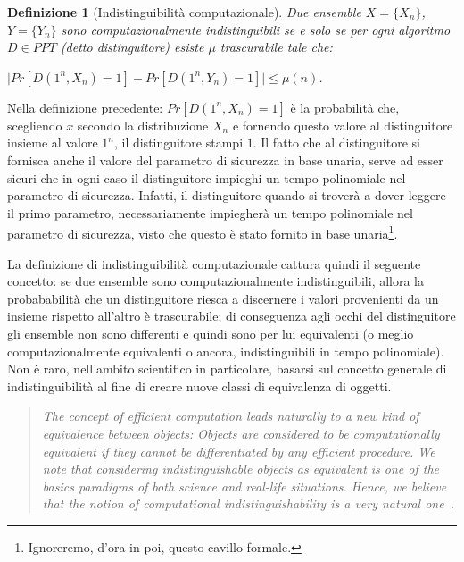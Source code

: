 \documentclass[a4paper,openright,twoside,12pt]{report}
\newtheorem{definizione}{Definizione}[chapter]
\begin{document}
\begin{definizione}[Indistinguibilit\`a computazionale]
Due ensemble $X=\{X_n\}$, $Y=\{Y_n\}$ sono computazionalmente indistinguibili se e solo se per ogni algoritmo $D \in PPT$ (detto distinguitore) esiste $\mu$ trascurabile tale che:
\begin{center}$\lvert Pr[D(1^n, X_n) = 1] - Pr[D(1^n, Y_n) = 1] \rvert \leq \mu(n)$.\end{center}
\end{definizione}
Nella definizione precedente: $Pr[D(1^n, X_n) = 1]$ \`e la probabilit\`a che, scegliendo $x$ secondo la distribuzione $X_n$ e fornendo questo valore al distinguitore insieme al valore $1^n$, il distinguitore stampi $1$.
Il fatto che al distinguitore si fornisca anche il valore del parametro di sicurezza in base unaria, serve ad esser sicuri che in ogni caso il distinguitore impieghi un tempo polinomiale 
nel parametro di sicurezza.
Infatti, il distinguitore quando si trover\`a a dover leggere il primo parametro, necessariamente impiegher\`a un tempo polinomiale nel parametro di sicurezza, visto che questo \`e stato 
fornito in base unaria\footnote{Ignoreremo, d'ora in poi, questo cavillo formale.}.

La definizione di indistinguibilit\`a computazionale cattura quindi il seguente concetto: se due ensemble sono computazionalmente indistinguibili, 
allora la probababilit\`a che un distinguitore riesca a discernere i valori provenienti da un insieme rispetto all'altro \`e trascurabile; di conseguenza agli occhi del distinguitore 
gli ensemble non sono differenti e quindi sono per lui equivalenti (o meglio computazionalmente equivalenti o ancora, indistinguibili in tempo polinomiale). 
Non \`e raro, nell'ambito scientifico in particolare, basarsi sul concetto generale di indistinguibilit\`a al fine di creare nuove classi di equivalenza di oggetti.
\begin{quotation}
\emph{The concept of efficient computation leads naturally to a new kind of equivalence between objects: Objects are considered to be computationally equivalent if they cannot be
differentiated by any efficient procedure. We note that considering indistinguishable objects as equivalent is one of the basics paradigms of both science and real-life situations. Hence,
we believe that the notion of computational indistinguishability is a very natural one~\cite{519078}.}
\end{quotation}
\end{document}
